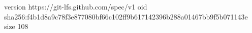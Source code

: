 version https://git-lfs.github.com/spec/v1
oid sha256:f4b1d8a9c78f3e877080bf66c102ff9b617142396b288a01467bb9f5b071143e
size 108
